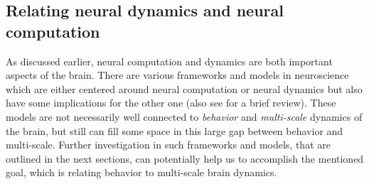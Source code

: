 \subsection{Relating neural dynamics and neural computation}\label{sec:relat-neur-dynam}

As discussed earlier, neural computation and dynamics are both important aspects of the brain.
There are various frameworks and models in neuroscience which are either centered around
neural computation
\cite{lengyelMatchingStorageRecall2005,deneveBayesianSpikingNeurons2008a,deneveBayesianSpikingNeurons2008,tanakaRecurrentInfomaxGenerates2008,buesingNeuralDynamicsSampling2011,boerlinPredictiveCodingDynamical2013,billDistributedBayesianComputation2015,chalkNeuralOscillationsSignature2016,zeldenrustEfficientRobustCoding2019,echevesteCorticallikeDynamicsRecurrent2020}
or neural dynamics
\cite{bertschingerRealtimeComputationEdge2004,eliasmithUnifiedApproachBuilding2005,sussilloNeuralCircuitsComputational2014,hidalgoInformationbasedFitnessEmergence2014a,shrikiOptimalInformationRepresentation2016,maassSearchingPrinciplesBrain2016,kimLearningRecurrentDynamics2018,chenComputingModulatingSpontaneous2019,michielsvankessenichPatternRecognitionNeuronal2019,finlinsonOptimalControlExcitable2020}
but also have some implications for the other one
(also see \citet{maassSearchingPrinciplesBrain2016} for a brief review).
These models are not necessarily well connected to \emph{behavior} and \emph{multi-scale} dynamics of the brain,
but still can fill some space in this large gap between behavior and multi-scale.
Further investigation in such frameworks and models, that are outlined in the next sections,
can potentially help us to accomplish the mentioned goal,
which is relating behavior to multi-scale brain dynamics.


